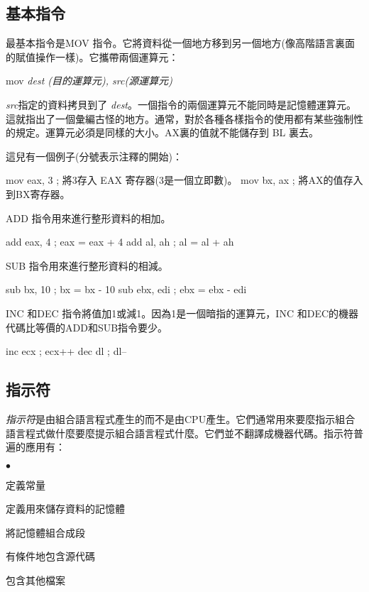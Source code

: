 \subsection{基本指令}

最基本指令是{\code MOV}
指令。它將資料從一個地方移到另一個地方(像高階語言裏面的賦值操作一樣)。它攜帶兩個運算元：
\begin{CodeQuote}
  mov {\em dest (目的運算元), src(源運算元)}
\end{CodeQuote}
{\em src}指定的資料拷貝到了{\em
dest\/}。一個指令的兩個運算元不能同時是記憶體運算元。這就指出了一個彙編古怪的地方。通常，對於各種各樣指令的使用都有某些強制性的規定。運算元必須是同樣的大小。AX裏的值就不能儲存到
BL 裏去。

這兒有一個例子(分號表示注釋的開始)：
\begin{AsmCodeListing}[frame=none, numbers=none]
      mov    eax, 3   ; 將3存入 EAX 寄存器(3是一個立即數)。
      mov    bx, ax   ; 將AX的值存入到BX寄存器。
\end{AsmCodeListing}

{\code ADD} 指令用來進行整形資料的相加。
\begin{AsmCodeListing}[frame=none, numbers=none]
      add    eax, 4   ; eax = eax + 4
      add    al, ah   ; al = al + ah
\end{AsmCodeListing}

{\code SUB} 指令用來進行整形資料的相減。
\begin{AsmCodeListing}[frame=none, numbers=none]
      sub    bx, 10   ; bx = bx - 10
      sub    ebx, edi ; ebx = ebx - edi
\end{AsmCodeListing}

{\code INC} 和{\code DEC}
指令將值加1或減1。因為1是一個暗指的運算元，{\code INC}
和{\code DEC}的機器代碼比等價的{\code ADD}和{\code SUB}指令要少。
\begin{AsmCodeListing}[frame=none, numbers=none]
      inc    ecx      ; ecx++
      dec    dl       ; dl--
\end{AsmCodeListing}

\subsection{指示符}


\emph{指示符}是由組合語言程式產生的而不是由CPU產生。它們通常用來要麼指示組合語言程式做什麼要麼提示組合語言程式什麼。它們並不翻譯成機器代碼。指示符普遍的應用有：
\begin{list}{$\bullet$}{\setlength{\itemsep}{0pt}}
\item 定義常量
\item 定義用來儲存資料的記憶體
\item 將記憶體組合成段
\item 有條件地包含源代碼
\item 包含其他檔案
\end{list}

